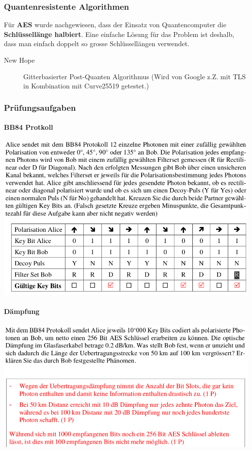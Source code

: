 \subsubsection{Quantenresistente Algorithmen}
Für \textbf{AES} wurde nachgewiesen, dass der Einsatz von Quantencomputer die \textbf{Schlüssellänge halbiert}. Eine einfache Lösung für das Problem ist deshalb, dass man einfach doppelt so grosse Schlüssellängen verwendet. 
\begin{description}
	\item[New Hope] Gitterbasierter Post-Quanten Algorithmus (Wird von Google z.Z. mit TLS in Kombination mit Curve25519 getestet.)
\end{description}

\subsubsection{Prüfungsaufgaben}
\paragraph{BB84 Protkoll} \hfill
\newline
\begin{minipage}[t]{1\textwidth}
    \centering
	\includegraphics[width=0.9\linewidth]{images/hs18-19-bb84.png}
\end{minipage}
\paragraph{Dämpfung} \hfill
\newline
\begin{minipage}[t]{1\textwidth}
    \centering
	\includegraphics[width=0.9\linewidth]{images/hs18-19-daempfung.png}
\end{minipage}


